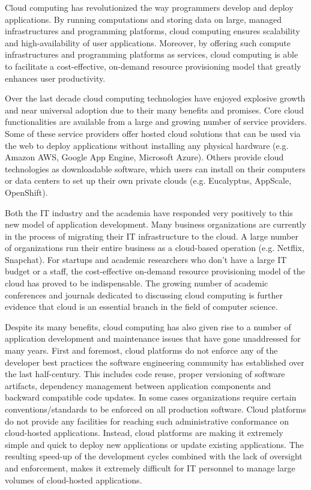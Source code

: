 Cloud computing has revolutionized the way programmers develop and deploy applications.
By running computations and storing data on large, managed infrastructures and 
programming platforms, cloud computing ensures scalability and high-availability of 
user applications. Moreover, by offering such compute infrastructures and programming 
platforms as services, cloud computing is able to facilitate a cost-effective, on-demand
resource provisioning model that greatly enhances user productivity.

Over the last decade cloud computing technologies have enjoyed explosive growth 
and near universal adoption due to their many benefits and promises. Core cloud 
functionalities are available from a large and growing number of service providers. 
Some of these service providers offer hosted cloud solutions that can be used
via the web to deploy applications without installing any physical hardware 
(e.g. Amazon AWS, Google App Engine, Microsoft Azure). Others
provide cloud technologies as downloadable software, which users can install
on their computers or data centers to set up their own private clouds 
(e.g. Eucalyptus, AppScale, OpenShift). 

Both the IT industry and the academia have responded very positively to this new 
model of application 
development. Many business organizations are currently in the process of migrating
their IT infrastructure to the cloud. A large number of organizations
run their entire business as a cloud-based operation (e.g. Netflix, Snapchat). For startups
and academic researchers who don't have a large IT budget or a staff, the cost-effective 
on-demand resource provisioning model of the cloud has proved to be indispensable.
The growing number of academic conferences and journals dedicated to discussing
cloud computing is further evidence that cloud is an essential branch in the field
of computer science.

Despite its many benefits, cloud computing has also given rise to a number of application
development and maintenance issues that have gone unaddressed for many years. 
First and foremost, cloud platforms do not enforce any of the developer best practices
the software engineering community has established over the last half-century. This
includes code reuse, proper versioning of software artifacts, dependency management
between application components and backward compatible code updates. In
some cases organizations require certain conventions/standards to be enforced on
all production software. Cloud platforms do not provide any facilities for reaching
such administrative conformance on cloud-hosted applications. Instead, cloud platforms
are making it extremely simple and quick to deploy new applications or update existing
applications. The resulting speed-up of the development cycles combined with the lack of 
oversight and enforcement, makes it extremely difficult for 
IT personnel to manage large volumes of cloud-hosted applications.

